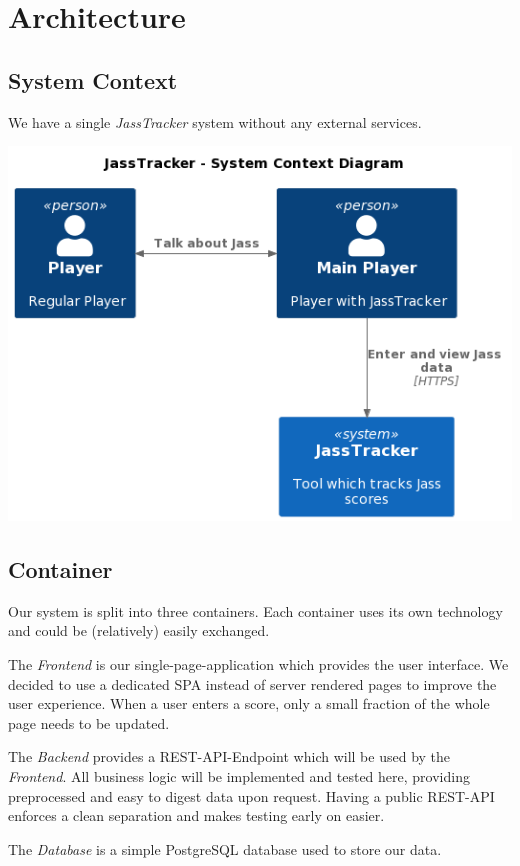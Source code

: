 \chapter{Architecture}

\section{System Context}
We have a single \emph{JassTracker} system without any external services.

\includegraphics[width=\textwidth]{resources/diagrams/c4-1-system-context}

\section{Container}
Our system is split into three containers.
Each container uses its own technology and could be (relatively) easily exchanged.

The \emph{Frontend} is our single-page-application which provides the user interface.
We decided to use a dedicated SPA instead of server rendered pages to improve the user experience.
When a user enters a score, only a small fraction of the whole page needs to be updated.

The \emph{Backend} provides a REST-API-Endpoint which will be used by the \emph{Frontend}.
All business logic will be implemented and tested here, providing preprocessed and easy to digest data upon request.
Having a public REST-API enforces a clean separation and makes testing early on easier.

The \emph{Database} is a simple PostgreSQL database used to store our data.

